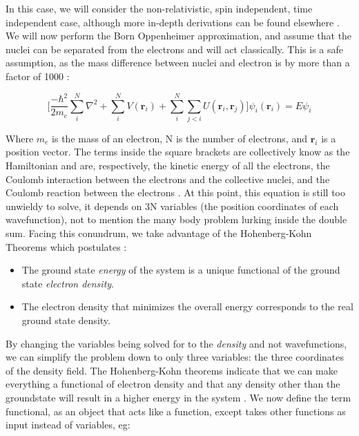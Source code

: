 In this case, we will consider the non-relativistic, spin independent, time independent case, although more in-depth derivations can be found elsewhere \cite{tddft}.  We will now perform the Born Oppenheimer approximation, and assume that the nuclei can be separated from the electrons and will act classically. This is a safe assumption, as the mass difference between nuclei and electron is by more than a factor of 1000 \cite{graff_direct_1980}:  

\begin{equation}
	\bigg[\frac{-\hbar^2}{2m_e}\sum_{i}^{N} \nabla^2 +\sum_{i}^{N} V(\textbf{r}_i) + \sum_{i}^{N}\sum_{j <i}U(\textbf{r}_i,\textbf{r}_j) \bigg] \psi_i(\textbf{r}_i) = E \psi_i
\end{equation}

Where $m_e$ is the mass of an electron, N is the number of electrons, and $\textbf{r}_i$ is a position vector. The terms inside the square brackets are collectively know as the Hamiltonian and are, respectively, the kinetic energy of all the electrons, the Coulomb interaction between the electrons and the collective nuclei, and the Coulomb reaction between the electrons \cite{sholl_density_2009}. At this point, this equation is still too unwieldy to solve, it depends on 3N variables (the position coordinates of each wavefunction), not to mention the many body problem lurking inside the double sum.  Facing this conundrum, we take advantage of the Hohenberg-Kohn Theorems which postulates \cite{hohenberg_inhomogeneous_1964}:
\begin{itemize}
	\item  The ground state \textit{energy} of the system is a unique functional of the ground state \textit{electron density}.
	\item The electron density that minimizes the overall energy corresponds to the real ground state density.  
\end{itemize}

By changing the variables being solved for to the \textit{density} and not wavefunctions, we can simplify the problem down to only three variables: the three coordinates of the density field.  The Hohenberg-Kohn theorems indicate that we can make everything a functional of electron density and that any density other than the groundstate will result in a higher energy in the system \cite{parr_density_1983}.  We now define the term functional, as an object that acts like a function, except takes other functions as input instead of variables, eg:

